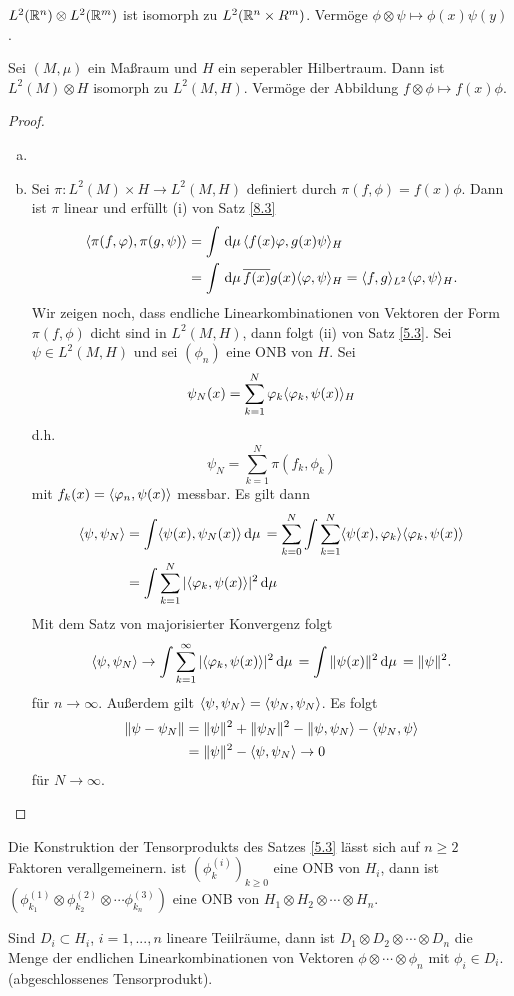 \documentclass{mycourse}
\begin{document}
\begin{kor}\label{8.4}
\item $L^2(\R^n)\otimes L^2(\R^m)$ ist isomorph zu $L^2(\R^n \times R^m)$. Vermöge $\phi \otimes \psi \mapsto \phi(x) \psi(y)$.
\item Sei $(M, \mu)$ ein Maßraum und $H$ ein seperabler Hilbertraum. Dann ist $L^2(M) \otimes H$ isomorph zu $L^2(M, H)$. Vermöge der Abbildung $f\otimes \phi \mapsto f(x) \phi$. 
\end{kor}
\begin{proof}
\begin{enumerate}[a)]
\item
\item Sei $\pi: L^2(M) \times H \to L^2(M, H)$ definiert durch $\pi(f,\phi)= f(x) \phi$. Dann ist $\pi$ linear und erfüllt (i) von Satz \ref{8.3}
\begin{align*}
\< \pi(f, \phi), \pi(g, \psi)\> &= \int \dx[\mu] \< f(x) \phi, g(x) \psi\>_H\\
&= \int \dx[\mu] \overline{f(x)} g(x) \< \phi, \psi\>_H = \< f,g\>_{L^2} \< \phi, \psi \>_H. 
\end{align*}
Wir zeigen noch, dass endliche Linearkombinationen von Vektoren der Form $\pi(f, \phi)$ dicht sind in $L^2(M,H)$, dann folgt (ii) von Satz \ref{5.3}. Sei $\psi \in L^2(M,H)$ und sei $(\phi_n)$ eine ONB von $H$. Sei 
\[
\psi_N(x) = \sum_{k=1}^N \phi_k \< \phi_k, \psi(x)\>_H
\]
d.h. 
\[
\psi_N= \sum_{k=1}^N \pi(f_k, \phi_k)
\]
mit $f_k(x) = \< \phi_n, \psi(x)\>$ messbar. Es gilt dann
\begin{align*}
\< \psi, \psi_N\> &= \int \< \psi(x), \psi_N(x)\> \dx[\mu] = \sum_{k=0}^N \int \sum_{k=1}^N \< \psi(x), \phi_k \> \< \phi_k, \psi(x)\>\\
&=\int \sum_{k=1}^N |\< \phi_k, \psi(x)\>|^2 \dx[\mu]
\end{align*}
Mit dem Satz von majorisierter Konvergenz folgt
\[
\< \psi, \psi_N\> \to \int \sum_{k=1}^\infty |\< \phi_k, \psi(x)\>|^2 \dx[\mu] = \int \| \psi(x)\|^2 \dx[\mu] = \| \psi\|^2.
\]
für $n\to \infty$. Außerdem gilt $\< \psi, \psi_N\> = \< \psi_N, \psi_N\>$. Es folgt
\begin{align*}
\| \psi- \psi_N\|&= \|\psi\|^2 + \| \psi_N\|^2 - \| \psi, \psi_N\> - \< \psi_N, \psi\> \\
&= \|\psi \|^2 - \< \psi, \psi_N\> \to 0 
\end{align*}
für $N\to \infty$.
\end{enumerate}
\end{proof}
\begin{nt*}
Die Konstruktion der Tensorprodukts des Satzes \ref{5.3} lässt sich auf $n\ge 2$ Faktoren verallgemeinern. ist $(\phi_k^{(i)})_{k\ge 0}$ eine ONB von $H_i$, dann ist $(\phi^{(1)}_{k_1} \otimes \phi_{k_2}^{(2)} \otimes \cdots \phi_{k_n}^{(3)})$ eine ONB von $H_1 \otimes H_2 \otimes \cdots \otimes H_n$.
\end{nt*}
\begin{df}
Sind $D_i \subset H_i$, $i=1, ..., n$ lineare Teiilräume, dann ist $D_1 \otimes D_2 \otimes \cdots \otimes D_n$ die Menge der endlichen Linearkombinationen von Vektoren $\phi \otimes \cdots \otimes \phi_n$ mit $\phi_i \in D_i$. (abgeschlossenes Tensorprodukt).
\end{df}
\end{document}
